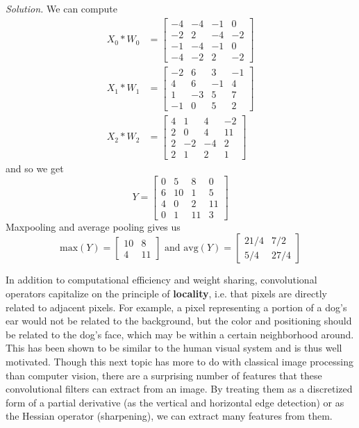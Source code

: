 \documentclass{article}
\theoremstyle{definition}
\theoremstyle{remark}
\theoremstyle{definition}
\newenvironment{solution}{\noindent \textit{Solution.}}{}
\begin{document}
    \begin{solution}
    We can compute 
    \begin{align*} 
        X_0 \ast  W_0 & = \begin{bmatrix} -4 & -4 & -1 & 0 \\ -2 & 2 & -4 & -2 \\ -1 & -4 & -1 & 0 \\ -4 & -2 & 2 & -2 \end{bmatrix} \\
        X_1 \ast W_1 & = \begin{bmatrix} -2 & 6 & 3 & -1 \\ 4 & 6 & -1 & 4 \\ 1 & -3 & 5 & 7 \\ -1 & 0 & 5 & 2 \end{bmatrix} \\
        X_2 \ast W_2 & = \begin{bmatrix} 4 & 1 & 4 & -2 \\ 2 & 0 & 4 & 11 \\ 2 & -2 & -4 & 2 \\ 2 & 1 & 2 & 1 \end{bmatrix}
    \end{align*}
    and so we get 
    \[Y = \begin{bmatrix} 0 & 5 & 8 & 0 \\ 6 & 10 & 1 & 5 \\ 4 &  0 & 2 & 11 \\ 0 & 1 & 11 & 3 \end{bmatrix}\]
    Maxpooling and average pooling gives us 
    \[\mathrm{max}(Y) = \begin{bmatrix} 10 & 8 \\ 4 & 11 \end{bmatrix} \text{ and } \mathrm{avg}(Y) = \begin{bmatrix} 21/4 & 7/2 \\ 5/4 & 27/4 \end{bmatrix}\]
    \end{solution}

    In addition to computational efficiency and weight sharing, convolutional operators capitalize on the principle of \textbf{locality}, i.e. that pixels are directly related to adjacent pixels. For example, a pixel representing a portion of a dog's ear would not be related to the background, but the color and positioning should be related to the dog's face, which may be within a certain neighborhood around. This has been shown to be similar to the human visual system and is thus well motivated. Though this next topic has more to do with classical image processing than computer vision, there are a surprising number of features that these convolutional filters can extract from an image. By treating them as a discretized form of a partial derivative (as the vertical and horizontal edge detection) or as the Hessian operator (sharpening), we can extract many features from them.  
\end{document}
